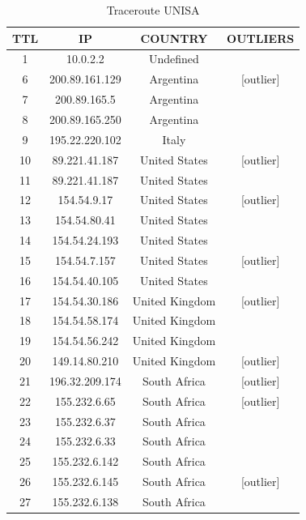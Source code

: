 \begin{table}[!htbp]
\centering
\caption{Traceroute UNISA}
\label{tabla-unisa}
\begin{tabular}{|c|c|c|c|}
\hline
\textbf{TTL} & \textbf{IP}    & \textbf{COUNTRY} & \textbf{OUTLIERS} \\ \hline
1   & 10.0.2.2       & Undefined      &               \\ \hline
6   & 200.89.161.129 & Argentina      & {[}outlier{]} \\ \hline
7   & 200.89.165.5   & Argentina      &               \\ \hline
8   & 200.89.165.250 & Argentina      &               \\ \hline
9   & 195.22.220.102 & Italy          &               \\ \hline
10  & 89.221.41.187  & United States  & {[}outlier{]} \\ \hline
11  & 89.221.41.187  & United States  &               \\ \hline
12  & 154.54.9.17    & United States  & {[}outlier{]} \\ \hline
13  & 154.54.80.41   & United States  &               \\ \hline
14  & 154.54.24.193  & United States  &               \\ \hline
15  & 154.54.7.157   & United States  & {[}outlier{]} \\ \hline
16  & 154.54.40.105  & United States  &               \\ \hline
17  & 154.54.30.186  & United Kingdom & {[}outlier{]} \\ \hline
18  & 154.54.58.174  & United Kingdom &               \\ \hline
19  & 154.54.56.242  & United Kingdom &               \\ \hline
20  & 149.14.80.210  & United Kingdom & {[}outlier{]} \\ \hline
21  & 196.32.209.174 & South Africa   & {[}outlier{]} \\ \hline
22  & 155.232.6.65   & South Africa   & {[}outlier{]} \\ \hline
23  & 155.232.6.37   & South Africa   &               \\ \hline
24  & 155.232.6.33   & South Africa   &               \\ \hline
25  & 155.232.6.142  & South Africa   &               \\ \hline
26  & 155.232.6.145  & South Africa   & {[}outlier{]} \\ \hline
27  & 155.232.6.138  & South Africa   &               \\ \hline
\end{tabular}
\end{table}

